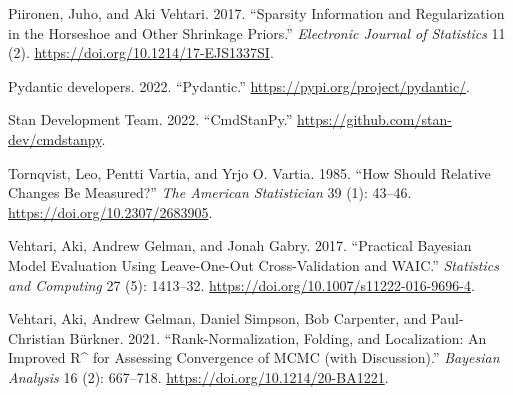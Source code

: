 \documentclass[
  letterpaper,
  DIV=11,
  numbers=noendperiod,
  oneside]{scrartcl}
\newlength{\cslhangindent}
\newenvironment{CSLReferences}[2] %
 {\begin{list}{}{%
  \setlength{\itemindent}{0pt}
  \setlength{\leftmargin}{0pt}
  \setlength{\parsep}{0pt}
  \ifodd #1
   \setlength{\leftmargin}{\cslhangindent}
   \setlength{\itemindent}{-1\cslhangindent}
  \fi
  \setlength{\itemsep}{#2\baselineskip}}}
 {\end{list}}
\theoremstyle{plain}
\theoremstyle{remark}
\begin{document}
\begin{CSLReferences}{1}{0}
Piironen, Juho, and Aki Vehtari. 2017. {``Sparsity Information and
Regularization in the Horseshoe and Other Shrinkage Priors.''}
\emph{Electronic Journal of Statistics} 11 (2).
\url{https://doi.org/10.1214/17-EJS1337SI}.

Pydantic developers. 2022. {``Pydantic.''}
\url{https://pypi.org/project/pydantic/}.

Stan Development Team. 2022. {``{CmdStanPy}.''}
\url{https://github.com/stan-dev/cmdstanpy}.

Tornqvist, Leo, Pentti Vartia, and Yrjo O. Vartia. 1985. {``How {Should
Relative Changes Be Measured}?''} \emph{The American Statistician} 39
(1): 43--46. \url{https://doi.org/10.2307/2683905}.

Vehtari, Aki, Andrew Gelman, and Jonah Gabry. 2017. {``Practical
{Bayesian} Model Evaluation Using Leave-One-Out Cross-Validation and
{WAIC}.''} \emph{Statistics and Computing} 27 (5): 1413--32.
\url{https://doi.org/10.1007/s11222-016-9696-4}.

Vehtari, Aki, Andrew Gelman, Daniel Simpson, Bob Carpenter, and
Paul-Christian Bürkner. 2021. {``Rank-{Normalization}, {Folding}, and
{Localization}: {An Improved R\^{}} for {Assessing Convergence} of
{MCMC} (with {Discussion}).''} \emph{Bayesian Analysis} 16 (2):
667--718. \url{https://doi.org/10.1214/20-BA1221}.

\end{CSLReferences}
\end{document}
